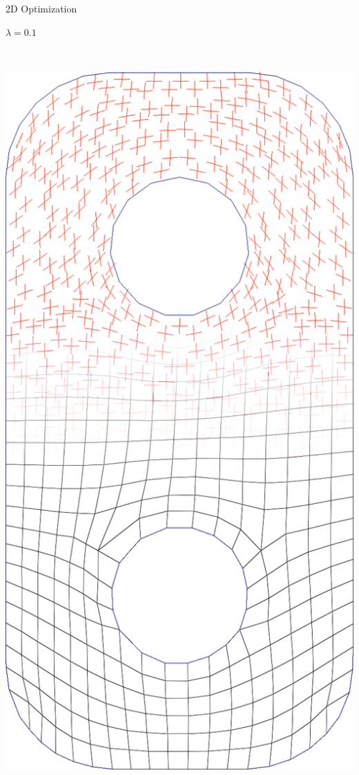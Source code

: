 \documentclass{beamer}
\begin{document}
\begin{frame}{2D Optimization}
\begin{minipage}[b]{0.15\textwidth}
        $\lambda = 0.1$
    \end{minipage}
    \ \ \ 
    \begin{minipage}[b]{0.15\textwidth}
        \centering
        \includegraphics[width=\textwidth]{img_spm_ff/perced_9}

\end{minipage}
\end{frame}
\end{document}
